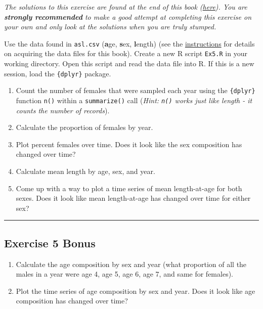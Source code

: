 \documentclass[]{book}
\providecommand{\tightlist}{%
  \setlength{\itemsep}{0pt}\setlength{\parskip}{0pt}}
\theoremstyle{definition}
\theoremstyle{definition}
\theoremstyle{definition}
\theoremstyle{remark}
\begin{document}
\emph{The solutions to this exercise are found at the end of this book
(\protect\hyperlink{ex5-answers}{here}). You are \textbf{strongly
recommended} to make a good attempt at completing this exercise on your
own and only look at the solutions when you are truly stumped.}

Use the data found in \texttt{asl.csv} (\textbf{a}ge, \textbf{s}ex,
\textbf{l}ength) (see the \protect\hyperlink{data-sets}{instructions}
for details on acquiring the data files for this book). Create a new R
script \texttt{Ex5.R} in your working directory. Open this script and
read the data file into R. If this is a new session, load the
\texttt{\{dplyr\}} package.

\begin{enumerate}
\def\labelenumi{\arabic{enumi}.}
\tightlist
\item
  Count the number of females that were sampled each year using the
  \texttt{\{dplyr\}} function \texttt{n()} within a \texttt{summarize()}
  call (\emph{Hint: \texttt{n()} works just like length - it counts the
  number of records}).
\item
  Calculate the proportion of females by year.
\item
  Plot percent females over time. Does it look like the sex composition
  has changed over time?
\item
  Calculate mean length by age, sex, and year.
\item
  Come up with a way to plot a time series of mean length-at-age for
  both sexes. Does it look like mean length-at-age has changed over time
  for either sex?
\end{enumerate}

\begin{center}\rule{0.5\linewidth}{\linethickness}\end{center}

\subsection*{Exercise 5 Bonus}\label{exercise-5-bonus}

\begin{enumerate}
\def\labelenumi{\arabic{enumi}.}
\tightlist
\item
  Calculate the age composition by sex and year (what proportion of all
  the males in a year were age 4, age 5, age 6, age 7, and same for
  females).
\item
  Plot the time series of age composition by sex and year. Does it look
  like age composition has changed over time?
\end{enumerate}
\end{document}
